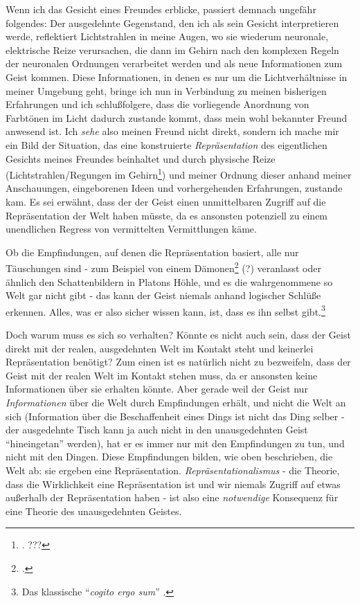 \documentclass[a4paper, 12pt]{article}
\begin{document}
\begin{onehalfspace}
Wenn ich das Gesicht eines Freundes erblicke, passiert demnach ungefähr folgendes: Der ausgedehnte Gegenstand, den ich als sein Gesicht interpretieren werde, reflektiert Lichtstrahlen in meine Augen, wo sie wiederum neuronale, elektrische Reize verursachen, die dann im Gehirn nach den komplexen Regeln der neuronalen Ordnungen verarbeitet werden und als neue Informationen zum Geist kommen. Diese Informationen, in denen es nur um die Lichtverhältnisse in meiner Umgebung geht, bringe ich nun in Verbindung zu meinen bisherigen Erfahrungen und ich schlußfolgere, dass die vorliegende Anordnung von Farbtönen im Licht dadurch zustande kommt, dass mein wohl bekannter Freund anwesend ist. Ich \emph{sehe} also meinen Freund nicht direkt, sondern ich mache mir ein Bild der Situation, das eine konstruierte \emph{Repräsentation} des eigentlichen Gesichts meines Freundes beinhaltet und durch physische Reize (Lichtstrahlen/Regungen im Gehirn\footnote{\Cite[Vgl.][S. 270f.]{scheler-idole}. ???}) und meiner Ordnung dieser anhand meiner Anschauungen, eingeborenen Ideen und vorhergehenden Erfahrungen, zustande kam. Es sei erwähnt, dass der der Geist einen unmittelbaren Zugriff auf die Repräsentation der Welt haben müsste, da es ansonsten potenziell zu einem unendlichen Regress von vermittelten Vermittlungen käme.

Ob die Empfindungen, auf denen die Repräsentation basiert, alle nur Täuschungen sind - zum Beispiel von einem Dämonen\footnote{\Cite[Vgl.][S.?]{descartes}.} (?) veranlasst oder ähnlich den Schattenbildern in Platons Höhle, und es die wahrgenommene so Welt gar nicht gibt - das kann der Geist niemals anhand logischer Schlüße erkennen. Alles, was er also sicher wissen kann, ist, dass es ihn selbst gibt.\footnote{Das klassische "`\emph{cogito ergo sum}"' .} 

Doch warum muss es sich so verhalten? Könnte es nicht auch sein, dass der Geist direkt mit der realen, ausgedehnten Welt im Kontakt steht und keinerlei Repräsentation benötigt? Zum einen ist es natürlich nicht zu bezweifeln, dass der Geist mit der realen Welt im Kontakt stehen muss, da er ansonsten keine Informationen über sie erhalten könnte. Aber gerade weil der Geist nur \emph{Informationen} über die Welt durch Empfindungen erhält, und nicht die Welt an sich (Information über die Beschaffenheit eines Dings ist nicht das Ding selber - der ausgedehnte Tisch kann ja auch nicht in den unausgedehnten Geist "`hineingetan"' werden), hat er es immer nur mit den Empfindungen zu tun, und nicht mit den Dingen. Diese Empfindungen bilden, wie oben beschrieben, die Welt ab: sie ergeben eine Repräsentation. \emph{Repräsentationalismus} - die Theorie, dass die Wirklichkeit eine Repräsentation ist und wir niemals Zugriff auf etwas außerhalb der Repräsentation haben - ist also eine \emph{notwendige} Konsequenz für eine Theorie des unausgedehnten Geistes.



\end{onehalfspace}
\end{document}
